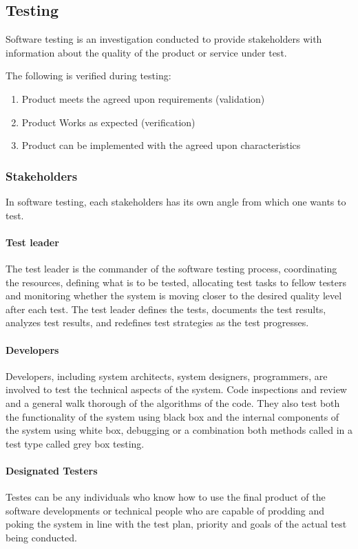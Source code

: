 \subsection{Testing}

Software testing is an investigation conducted to provide stakeholders with
information about the quality of the product or service under
test.\cite{wiki:software-testing}

The following is verified during testing:
\begin{enumerate}
	\item Product meets the agreed upon requirements (validation)
	\item Product Works as expected (verification)
	\item Product can be implemented with the agreed upon characteristics
\end{enumerate}
\subsubsection{Stakeholders}
In software testing, each stakeholders has its own angle from which one wants to test.\cite{wiki:software-testing2}

\paragraph{Test leader}
The test leader is the commander of the software testing process, coordinating the resources, defining what is to be tested, allocating test tasks to fellow testers and monitoring whether the system is moving closer to the desired quality level after each test. The test leader defines the tests, documents the test results, analyzes test results, and redefines test strategies as the test progresses.

\paragraph{Developers}
Developers, including system architects, system designers, programmers, are involved to test the technical aspects of the system. Code inspections and review and a general walk thorough of the algorithms of the code. They also test both the functionality of the system using black box and the internal components of the system using white box, debugging or a combination both methods called in a test type called grey box testing.

\paragraph{Designated Testers}
Testes can be any individuals who know how to use the final product of the software developments or technical people who are capable of prodding and poking the system in line with the test plan, priority and goals of the actual test being conducted.


